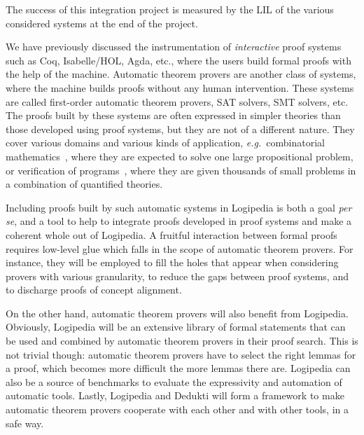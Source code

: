 The success of this integration project is measured by the LIL of the various
considered systems at the end of the project.


We have previously discussed the instrumentation of \emph{interactive}
proof systems such as Coq, Isabelle/HOL, Agda, etc.,
where the users build formal proofs with the help of the
machine. Automatic theorem provers are another class of systems, where
the machine builds proofs without any human intervention.
These systems are called first-order automatic theorem provers, SAT solvers, SMT
solvers, etc.
The proofs
built by these systems are often expressed in simpler theories than
those developed using proof systems, but they are not of a different
nature.  They cover various domains and various kinds of application,
{\em e.g.}\ combinatorial
mathematics~\cite{DBLP:journals/ai/KonevL15,DBLP:conf/sat/HeuleKM16},
where they are expected to solve one large propositional problem, or
verification of
programs~\cite{DBLP:conf/esop/FilliatreP13,DBLP:journals/pacmpl/ProtzenkoZRRWBD17},
where they are given thousands of small problems in a combination of
quantified theories.

Including proofs built by such automatic systems in Logipedia
is both a goal {\em per se}, and a tool to help to
integrate proofs developed in proof systems and make a coherent whole out
of Logipedia. A fruitful interaction between formal proofs requires
low-level glue which falls in the scope of automatic theorem provers.
For instance, they will be employed to fill the holes that appear when
considering provers with various granularity, to reduce the gaps
between proof systems, and to discharge proofs of concept alignment.

On the other hand, automatic theorem provers will also benefit from
Logipedia. Obviously, Logipedia will be an extensive library of formal
statements that can be used and combined by automatic theorem provers in their
proof search. This is not trivial though: automatic theorem provers have to
select the right lemmas for a proof, which becomes more difficult the more
lemmas there are.  Logipedia can also be a source of benchmarks to evaluate the
expressivity and automation of automatic tools.  Lastly, Logipedia and Dedukti
will form a framework to make automatic theorem provers cooperate with each
other and with other tools, in a safe way.

